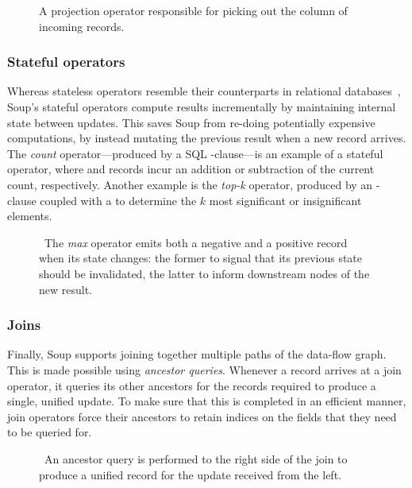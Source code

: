 \begin{figure}[H]
  \centering
  
  \caption{A projection operator responsible for picking out the 
  column of incoming records.}\label{fig:project}
\end{figure}

\subsubsection{Stateful operators}

Whereas stateless operators resemble their counterparts in relational
databases~\cite{codd}, Soup's stateful operators compute results incrementally
by maintaining internal state between updates. This saves Soup from re-doing
potentially expensive computations, by instead mutating the previous result when
a new record arrives. The \textit{count} operator---produced by a SQL
-clause---is an example of a stateful operator, where
 and  records incur an addition or subtraction of
the current count, respectively. Another example is the \textit{top-k} operator,
produced by \eg an -clause coupled with a  to
determine the $ k $ most significant or insignificant elements.

\begin{figure}[H]
  \centering
  
  \caption{\
    The \textit{max} operator emits both a negative and a positive record when
    its state changes: the former to signal that its previous state should be
    invalidated, the latter to inform downstream nodes of the new result.
  }
\end{figure}

\subsubsection{Joins}

Finally, Soup supports joining together multiple paths of the data-flow graph.
This is made possible using \textit{ancestor queries}. Whenever a record arrives
at a join operator, it queries its other ancestors for the records required to
produce a single, unified update. To make sure that this is completed in an
efficient manner, join operators force their ancestors to retain indices on the
fields that they need to be queried for.

\begin{figure}[H]
  \centering
  
  \caption{\
    An ancestor query is performed to the right side of the join to produce a
    unified record for the update received from the left.
  }
\end{figure}

